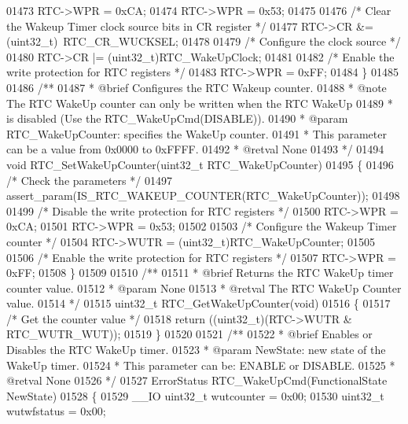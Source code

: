 \begin{DoxyCode}
01473   RTC->WPR = 0xCA;
01474   RTC->WPR = 0x53;
01475 
01476   \textcolor{comment}{/* Clear the Wakeup Timer clock source bits in CR register */}
01477   RTC->CR &= (uint32\_t)~RTC_CR_WUCKSEL;
01478 
01479   \textcolor{comment}{/* Configure the clock source */}
01480   RTC->CR |= (uint32\_t)RTC\_WakeUpClock;
01481 
01482   \textcolor{comment}{/* Enable the write protection for RTC registers */}
01483   RTC->WPR = 0xFF;
01484 \}
01485 
01486 \textcolor{comment}{/**}
01487 \textcolor{comment}{  * @brief  Configures the RTC Wakeup counter.}
01488 \textcolor{comment}{  * @note   The RTC WakeUp counter can only be written when the RTC WakeUp}
01489 \textcolor{comment}{  *         is disabled (Use the RTC\_WakeUpCmd(DISABLE)).        }
01490 \textcolor{comment}{  * @param  RTC\_WakeUpCounter: specifies the WakeUp counter.}
01491 \textcolor{comment}{  *          This parameter can be a value from 0x0000 to 0xFFFF. }
01492 \textcolor{comment}{  * @retval None}
01493 \textcolor{comment}{  */}
01494 \textcolor{keywordtype}{void} RTC_SetWakeUpCounter(uint32\_t RTC\_WakeUpCounter)
01495 \{
01496   \textcolor{comment}{/* Check the parameters */}
01497   assert_param(IS\_RTC\_WAKEUP\_COUNTER(RTC\_WakeUpCounter));
01498 
01499   \textcolor{comment}{/* Disable the write protection for RTC registers */}
01500   RTC->WPR = 0xCA;
01501   RTC->WPR = 0x53;
01502 
01503   \textcolor{comment}{/* Configure the Wakeup Timer counter */}
01504   RTC->WUTR = (uint32\_t)RTC\_WakeUpCounter;
01505 
01506   \textcolor{comment}{/* Enable the write protection for RTC registers */}
01507   RTC->WPR = 0xFF;
01508 \}
01509 
01510 \textcolor{comment}{/**}
01511 \textcolor{comment}{  * @brief  Returns the RTC WakeUp timer counter value.}
01512 \textcolor{comment}{  * @param  None}
01513 \textcolor{comment}{  * @retval The RTC WakeUp Counter value.}
01514 \textcolor{comment}{  */}
01515 uint32\_t RTC_GetWakeUpCounter(\textcolor{keywordtype}{void})
01516 \{
01517   \textcolor{comment}{/* Get the counter value */}
01518   \textcolor{keywordflow}{return} ((uint32\_t)(RTC->WUTR & RTC_WUTR_WUT));
01519 \}
01520 
01521 \textcolor{comment}{/**}
01522 \textcolor{comment}{  * @brief  Enables or Disables the RTC WakeUp timer.}
01523 \textcolor{comment}{  * @param  NewState: new state of the WakeUp timer.}
01524 \textcolor{comment}{  *          This parameter can be: ENABLE or DISABLE.}
01525 \textcolor{comment}{  * @retval None}
01526 \textcolor{comment}{  */}
01527 ErrorStatus RTC_WakeUpCmd(FunctionalState NewState)
01528 \{
01529   \_\_IO uint32\_t wutcounter = 0x00;
01530   uint32\_t wutwfstatus = 0x00;

\end{DoxyCode}
